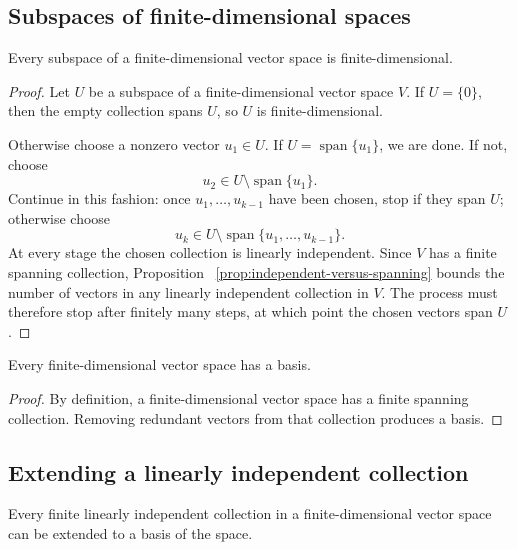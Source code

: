 \subsection{Subspaces of finite-dimensional spaces}

\begin{proposition}
  Every subspace of a finite-dimensional vector space is
  finite-dimensional.
\end{proposition}

\begin{proof}
  Let $U$ be a subspace of a finite-dimensional vector space $V$. If
  $U=\{0\}$, then the empty collection spans $U$, so $U$ is
  finite-dimensional.

  Otherwise choose a nonzero vector $u_1\in U$. If
  $U=\operatorname{span}\{u_1\}$, we are done. If not, choose
  \[
    u_2\in U\setminus\operatorname{span}\{u_1\}.
  \]
  Continue in this fashion: once $u_1,\ldots,u_{k-1}$ have been chosen,
  stop if they span $U$; otherwise choose
  \[
    u_k\in U\setminus\operatorname{span}\{u_1,\ldots,u_{k-1}\}.
  \]
  At every stage the chosen collection is linearly independent. Since
  $V$ has a finite spanning collection, Proposition~
  \ref{prop:independent-versus-spanning} bounds the number of vectors in
  any linearly independent collection in $V$. The process must therefore
  stop after finitely many steps, at which point the chosen vectors span
  $U$.
\end{proof}

\begin{corollary}
  Every finite-dimensional vector space has a basis.
\end{corollary}

\begin{proof}
  By definition, a finite-dimensional vector space has a finite spanning
  collection. Removing redundant vectors from that collection produces
  a basis.
\end{proof}

\subsection{Extending a linearly independent collection}

\begin{proposition}
  Every finite linearly independent collection in a finite-dimensional
  vector space can be extended to a basis of the space.
\end{proposition}

